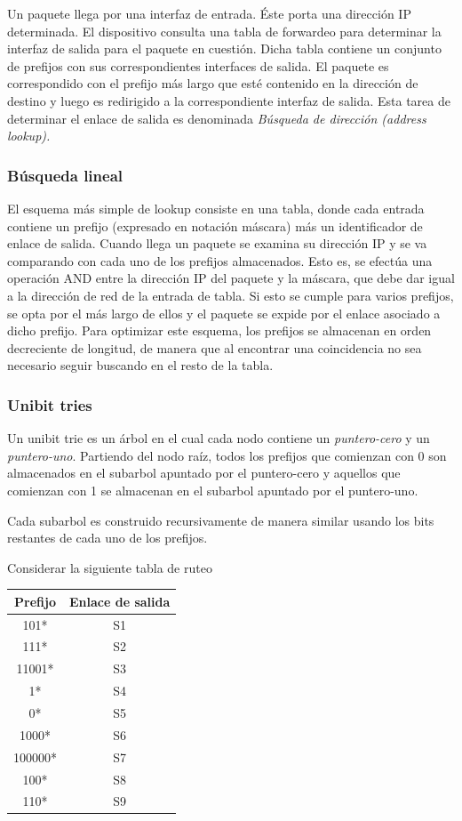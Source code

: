 Un paquete llega por una interfaz de entrada. Éste porta una dirección IP determinada. El dispositivo consulta una tabla de forwardeo para determinar la interfaz de salida para el paquete en cuestión. Dicha tabla contiene un conjunto de prefijos con sus correspondientes interfaces de salida. El paquete es correspondido con el prefijo más largo que esté contenido en la dirección de destino y luego es redirigido  a la correspondiente interfaz de salida. Esta tarea de determinar el enlace de salida es denominada \textit{Búsqueda de dirección (address lookup).}

\subsubsection{Búsqueda lineal}

El esquema más simple de lookup consiste en una tabla, donde cada entrada contiene un prefijo (expresado en notación máscara) más un identificador de enlace de salida. Cuando llega un paquete se examina su dirección IP y se va comparando con cada uno de los prefijos almacenados. Esto es, se efectúa una operación AND entre la dirección IP del paquete y la máscara, que debe dar igual a la dirección de red de la entrada de tabla. Si esto se cumple para varios prefijos, se opta por el más largo de ellos y el paquete se expide por el enlace asociado a dicho prefijo.
Para optimizar este esquema, los prefijos se almacenan en orden decreciente de longitud, de manera que al encontrar una coincidencia no sea necesario seguir buscando en el resto de la tabla.

\subsubsection {Unibit tries}

Un unibit trie es un árbol en el cual cada nodo contiene un \textit{puntero-cero }y un \textit{puntero-uno}. Partiendo del nodo raíz, todos los prefijos que comienzan con 0 son almacenados en el subarbol apuntado por el puntero-cero y aquellos que comienzan con 1 se almacenan en el subarbol apuntado por el puntero-uno.

Cada subarbol es construido recursivamente de manera similar usando los bits restantes de cada uno de los prefijos.

Considerar la siguiente tabla de ruteo

\begin{center}
	\begin{tabular}{|c|c|} \hline
		\textbf{Prefijo} & \textbf{Enlace de salida} \\ \hline
		101* & S1 \\
		111* & S2 \\
		11001* & S3 \\
		1* & S4 \\
		0* & S5 \\
		1000* & S6 \\
		100000* & S7 \\
		100* & S8 \\
		110* & S9 \\	\hline
	\end{tabular}	
\end{center}




